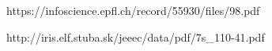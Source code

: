 https://infoscience.epfl.ch/record/55930/files/98.pdf

http://iris.elf.stuba.sk/jeeec/data/pdf/7s_110-41.pdf


